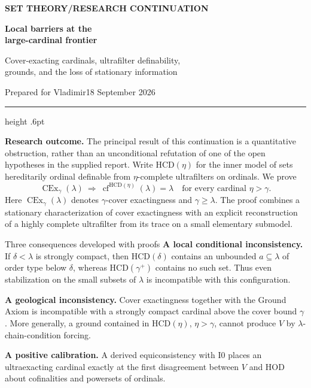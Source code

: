 \documentclass[11pt,letterpaper]{article}
\theoremstyle{definition}
\newcommand{\CEx}{\operatorname{CEx}}
\newcommand{\cf}{\operatorname{cf}}
\newcommand{\Izero}{\mathrm{I0}}
\newcommand{\HCD}{\mathrm{HCD}}
\newcommand{\Cex}[2]{\CEx_{#1}(#2)}
\theoremstyle{remark}
\begin{document}
\thispagestyle{empty}
{\sffamily\bfseries\small\color{Olive}SET THEORY\quad /\quad RESEARCH CONTINUATION}

\vspace{13pt}
{\fontsize{28}{31}\selectfont\bfseries\color{Forest}Local barriers at the\\ large-cardinal frontier\par}
\vspace{10pt}
{\fontsize{14}{18}\selectfont Cover-exacting cardinals, ultrafilter definability,\\ grounds, and the loss of stationary information\par}
\vspace{14pt}
{\color{Muted}Prepared for Vladimir\hfill 18 September 2026\par}
\vspace{3pt}
{\color{Sage}\hrule height .6pt}
\vspace{12pt}

\textbf{Research outcome.} The principal result of this continuation is a quantitative obstruction, rather than an unconditional refutation of one of the open hypotheses in the supplied report. Write $\HCD(\eta)$ for the inner model of sets hereditarily ordinal definable from $\eta$-complete ultrafilters on ordinals. We prove
\[
 \boxed{\quad \Cex{\gamma}{\lambda}\ \Longrightarrow\
 \cf^{\HCD(\eta)}(\lambda)=\lambda
 \quad\text{for every cardinal }\eta>\gamma.\quad}
\]
Here $\Cex{\gamma}{\lambda}$ denotes $\gamma$-cover exactingness and $\gamma\geq\lambda$. The proof combines a stationary characterization of cover exactingness with an explicit reconstruction of a highly complete ultrafilter from its trace on a small elementary submodel.

\begin{assessment}{Three consequences developed with proofs}
\textbf{A local conditional inconsistency.} If $\delta<\lambda$ is strongly compact, then $\HCD(\delta)$ contains an unbounded $a\subseteq\lambda$ of order type below $\delta$, whereas $\HCD(\gamma^+)$ contains no such set. Thus even stabilization on the small subsets of $\lambda$ is incompatible with this configuration.

\textbf{A geological inconsistency.} Cover exactingness together with the Ground Axiom is incompatible with a strongly compact cardinal above the cover bound $\gamma$. More generally, a ground contained in $\HCD(\eta)$, $\eta>\gamma$, cannot produce $V$ by $\lambda$-chain-condition forcing.

\textbf{A positive calibration.} A derived equiconsistency with $\Izero$ places an ultraexacting cardinal exactly at the first disagreement between $V$ and HOD about cofinalities and powersets of ordinals.
\end{assessment}
\end{document}
